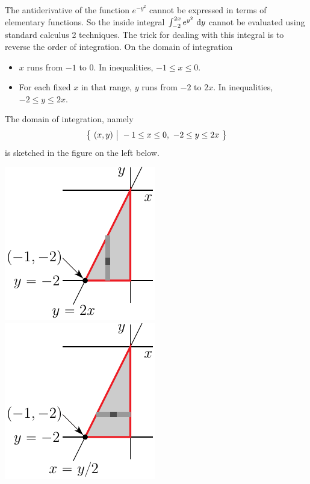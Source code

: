 \begin{solution}
The antiderivative of the function $e^{-y^2}$ cannot be expressed
in terms of elementary functions. So the inside integral 
$\int_{-2}^{2x} e^{y^2}\ \dee{y}$ cannot be evaluated using 
standard calculus 2 techniques. The trick for dealing with this
integral is to reverse the order of integration.
On the domain of integration 
\begin{itemize}
\item
$x$ runs from $-1$ to $0$. In inequalities, $-1\le x\le 0$.
\item
For each fixed $x$ in that range, $y$ runs from $-2$ to
$2x$. In inequalities,  $-2\le y\le 2x$.
\end{itemize}
The domain of integration, namely
\begin{equation*}
\big\{ \ (x,y)\ \big|\ -1\le x\le 0,\ -2\le y\le 2x\ \big\}
\end{equation*} 
is sketched in the figure on the left below.

\begin{center}
     \includegraphics{fig/OE13D_6a.pdf}\qquad
     \includegraphics{fig/OE13D_6b.pdf}
\end{center}


\end{solution}
